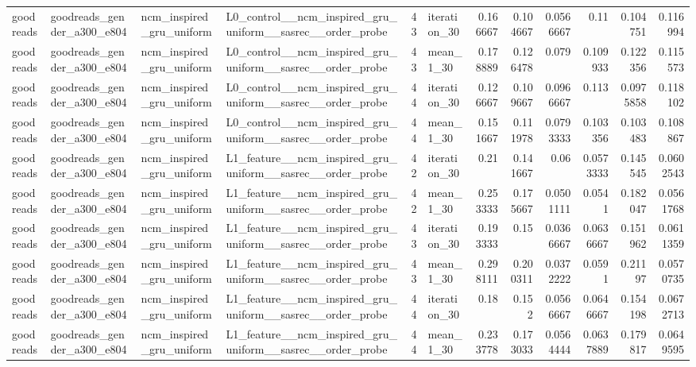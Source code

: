 \begin{table}[htbp!]
\begin{tabular}{llllrlrrrrrr}
goodreads & goodreads\_gender\_a300\_e804 & ncm\_inspired\_gru\_uniform & L0\_control\_\_ncm\_inspired\_gru\_uniform\_\_sasrec\_\_order\_probe & 43 & iteration\_30 & 0.166667 & 0.104667 & 0.0566667 & 0.11 & 0.104751 & 0.116994 \\
goodreads & goodreads\_gender\_a300\_e804 & ncm\_inspired\_gru\_uniform & L0\_control\_\_ncm\_inspired\_gru\_uniform\_\_sasrec\_\_order\_probe & 43 & mean\_1\_30 & 0.178889 & 0.126478 & 0.079 & 0.109933 & 0.122356 & 0.115573 \\
goodreads & goodreads\_gender\_a300\_e804 & ncm\_inspired\_gru\_uniform & L0\_control\_\_ncm\_inspired\_gru\_uniform\_\_sasrec\_\_order\_probe & 44 & iteration\_30 & 0.126667 & 0.109667 & 0.0966667 & 0.113 & 0.0975858 & 0.118102 \\
goodreads & goodreads\_gender\_a300\_e804 & ncm\_inspired\_gru\_uniform & L0\_control\_\_ncm\_inspired\_gru\_uniform\_\_sasrec\_\_order\_probe & 44 & mean\_1\_30 & 0.151667 & 0.111978 & 0.0793333 & 0.103356 & 0.103483 & 0.108867 \\
goodreads & goodreads\_gender\_a300\_e804 & ncm\_inspired\_gru\_uniform & L1\_feature\_\_ncm\_inspired\_gru\_uniform\_\_sasrec\_\_order\_probe & 42 & iteration\_30 & 0.21 & 0.141667 & 0.06 & 0.0573333 & 0.145545 & 0.0602543 \\
goodreads & goodreads\_gender\_a300\_e804 & ncm\_inspired\_gru\_uniform & L1\_feature\_\_ncm\_inspired\_gru\_uniform\_\_sasrec\_\_order\_probe & 42 & mean\_1\_30 & 0.253333 & 0.175667 & 0.0501111 & 0.0541 & 0.182047 & 0.0561768 \\
goodreads & goodreads\_gender\_a300\_e804 & ncm\_inspired\_gru\_uniform & L1\_feature\_\_ncm\_inspired\_gru\_uniform\_\_sasrec\_\_order\_probe & 43 & iteration\_30 & 0.193333 & 0.15 & 0.0366667 & 0.0636667 & 0.151962 & 0.0611359 \\
goodreads & goodreads\_gender\_a300\_e804 & ncm\_inspired\_gru\_uniform & L1\_feature\_\_ncm\_inspired\_gru\_uniform\_\_sasrec\_\_order\_probe & 43 & mean\_1\_30 & 0.298111 & 0.200311 & 0.0372222 & 0.0591 & 0.21197 & 0.0570735 \\
goodreads & goodreads\_gender\_a300\_e804 & ncm\_inspired\_gru\_uniform & L1\_feature\_\_ncm\_inspired\_gru\_uniform\_\_sasrec\_\_order\_probe & 44 & iteration\_30 & 0.18 & 0.152 & 0.0566667 & 0.0646667 & 0.154198 & 0.0672713 \\
goodreads & goodreads\_gender\_a300\_e804 & ncm\_inspired\_gru\_uniform & L1\_feature\_\_ncm\_inspired\_gru\_uniform\_\_sasrec\_\_order\_probe & 44 & mean\_1\_30 & 0.233778 & 0.173033 & 0.0564444 & 0.0637889 & 0.179817 & 0.0649595 \\

\end{tabular}
\end{table}
